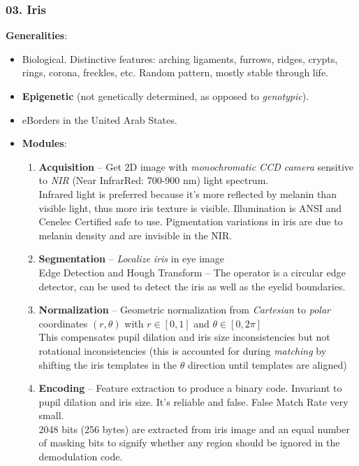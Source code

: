 \documentclass[a4paper]{article}
\begin{document}
    \subsubsection*{03. Iris}
      \textbf{Generalities}:
      \begin{itemize}
        \item Biological. Distinctive features: arching ligaments, furrows, ridges, crypts, rings, corona, freckles, etc. Random pattern, mostly stable through life.
        \item \textbf{Epigenetic} (not genetically determined, as opposed to \emph{genotypic}).
        \item eBorders in the United Arab States.
        \item\textbf{Modules}:
        \begin{enumerate}
          \item \textbf{Acquisition} -- Get 2D image with \emph{monochromatic CCD camera} sensitive to \emph{NIR} (Near InfrarRed: 700-900 nm) light spectrum.\\
          Infrared light is preferred because it's more reflected by melanin than visible light, thus more iris texture is visible. Illumination is ANSI and Cenelec Certified safe to use. Pigmentation variations in iris are due to melanin density and are invisible in the NIR.
          \item \textbf{Segmentation} -- \emph{Localize iris} in eye image\\
          Edge Detection and Hough Transform -- The operator is a circular edge detector, can be used to detect the iris as well as the eyelid boundaries.
          \item \textbf{Normalization} -- Geometric normalization from \emph{Cartesian} to \emph{polar} coordinates $(r,\theta)$ with $r\in [0,1]$ and $\theta\in [0,2\pi]$\\
          This compensates pupil dilation and iris size inconsistencies but not rotational inconsistencies (this is accounted for during \emph{matching} by shifting the iris templates in the $\theta$ direction until templates are aligned)
          \item \textbf{Encoding} -- Feature extraction to produce a binary code. Invariant to pupil dilation and iris size. It's reliable and false. False Match Rate very small.\\
          2048 bits (256 bytes) are extracted from iris image and an equal number of masking bits to signify whether any region should be ignored in the demodulation code.\\

\end{enumerate}
\end{itemize}
\end{document}

